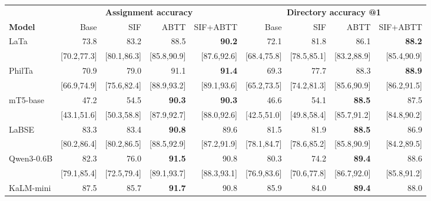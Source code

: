 \begin{table}[t]
\centering
\footnotesize
\setlength{\tabcolsep}{1.8pt}
\begin{tabular}{lrrrrrrrr}
\toprule
& \multicolumn{4}{c}{\textbf{Assignment accuracy}} & \multicolumn{4}{c}{\textbf{Directory accuracy @1}} \\
\cmidrule(lr){2-5}\cmidrule(lr){6-9}
\textbf{Model} & Base & SIF & ABTT & SIF+ABTT & Base & SIF & ABTT & SIF+ABTT \\
\midrule
LaTa & 73.8 & 83.2 & 88.5 & \textbf{90.2} & 72.1 & 81.8 & 86.1 & \textbf{88.2} \\
 & {\scriptsize [70.2,77.3]} & {\scriptsize [80.1,86.3]} & {\scriptsize [85.8,90.9]} & {\scriptsize [87.6,92.6]} & {\scriptsize [68.4,75.8]} & {\scriptsize [78.5,85.1]} & {\scriptsize [83.2,88.9]} & {\scriptsize [85.4,90.9]} \\
PhilTa & 70.9 & 79.0 & 91.1 & \textbf{91.4} & 69.3 & 77.7 & 88.3 & \textbf{88.9} \\
 & {\scriptsize [66.9,74.9]} & {\scriptsize [75.6,82.4]} & {\scriptsize [88.9,93.2]} & {\scriptsize [89.1,93.6]} & {\scriptsize [65.2,73.5]} & {\scriptsize [74.2,81.3]} & {\scriptsize [85.6,90.9]} & {\scriptsize [86.2,91.5]} \\
mT5-base & 47.2 & 54.5 & \textbf{90.3} & \textbf{90.3} & 46.6 & 54.1 & \textbf{88.5} & 87.5 \\
 & {\scriptsize [43.1,51.6]} & {\scriptsize [50.3,58.8]} & {\scriptsize [87.9,92.7]} & {\scriptsize [88.0,92.6]} & {\scriptsize [42.5,51.0]} & {\scriptsize [49.8,58.4]} & {\scriptsize [85.7,91.2]} & {\scriptsize [84.8,90.2]} \\
LaBSE & 83.3 & 83.4 & \textbf{90.8} & 89.6 & 81.5 & 81.9 & \textbf{88.5} & 86.9 \\
 & {\scriptsize [80.2,86.4]} & {\scriptsize [80.2,86.5]} & {\scriptsize [88.5,92.9]} & {\scriptsize [87.2,91.9]} & {\scriptsize [78.1,84.7]} & {\scriptsize [78.6,85.2]} & {\scriptsize [85.8,90.9]} & {\scriptsize [84.2,89.5]} \\
Qwen3-0.6B & 82.3 & 76.0 & \textbf{91.5} & 90.8 & 80.3 & 74.2 & \textbf{89.4} & 88.6 \\
 & {\scriptsize [79.1,85.4]} & {\scriptsize [72.5,79.4]} & {\scriptsize [89.1,93.7]} & {\scriptsize [88.3,93.1]} & {\scriptsize [76.9,83.6]} & {\scriptsize [70.6,77.8]} & {\scriptsize [86.7,92.0]} & {\scriptsize [85.8,91.2]} \\
KaLM-mini & 87.5 & 85.7 & \textbf{91.7} & 90.8 & 85.9 & 84.0 & \textbf{89.4} & 88.0 \\

\end{tabular}
\end{table}
